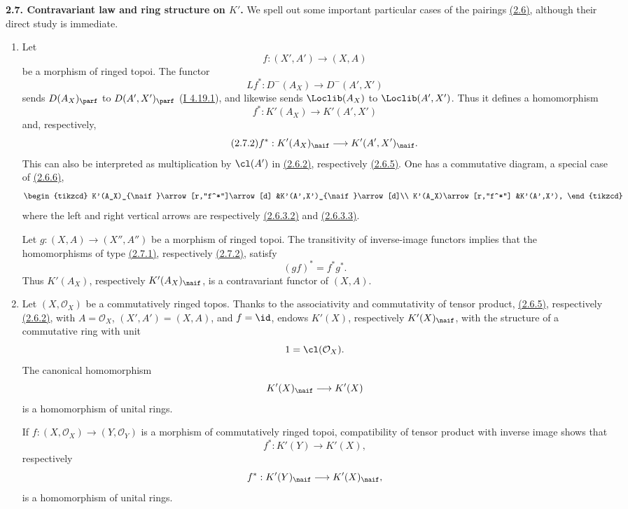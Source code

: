 \textbf{2.7. Contravariant law and ring structure on \(K'\).} We spell out some important particular cases of the pairings \hyperlink{sga6.e04.para.2-6}{(2.6)}, although their direct study is immediate.
\begin{enumerate}[label=\alph*)]
\item Let
\[
 f:(X',A')\longrightarrow (X,A)
\]
be a morphism of ringed topoi. The functor
\[
 Lf^*:D^-(A_X)\longrightarrow D^-(A',X')
\]
sends \(D(A_X)_{\parf}\) to \(D(A',X')_{\parf}\) (\hyperlink{sga6.e01.cor.4-19-1}{I 4.19.1}), and likewise sends \(\Loclib(A_X)\) to \(\Loclib(A',X')\). Thus it defines a homomorphism
\begin{equation}\tag{2.7.1}
 f^*:K'(A_X)\longrightarrow K'(A',X')
\end{equation}
and, respectively,
\begin{equation}\tag{2.7.2}
 f^*:K'(A_X)_{\naif}\longrightarrow K'(A',X')_{\naif}.
\end{equation}
This can also be interpreted as multiplication by \(\cl(A')\) in \hyperlink{sga6.e04.eq.2-6-2}{(2.6.2)}, respectively \hyperlink{sga6.e04.eq.2-6-5}{(2.6.5)}. One has a commutative diagram, a special case of \hyperlink{sga6.e04.eq.2-6-6}{(2.6.6)},
\[
\begin{tikzcd}
K'(A_X)_{\naif}\arrow[r,"f^*"]\arrow[d]
&K'(A',X')_{\naif}\arrow[d]\\
K'(A_X)\arrow[r,"f^*"]
&K'(A',X'),
\end{tikzcd}
\]
where the left and right vertical arrows are respectively \hyperlink{sga6.e04.eq.2-6-3-2}{(2.6.3.2)} and \hyperlink{sga6.e04.eq.2-6-3-3}{(2.6.3.3)}.

Let \(g:(X,A)\to(X'',A'')\) be a morphism of ringed topoi. The transitivity of inverse-image functors implies that the homomorphisms of type \hyperlink{sga6.e04.eq.2-7-1}{(2.7.1)}, respectively \hyperlink{sga6.e04.eq.2-7-2}{(2.7.2)}, satisfy
\begin{equation}\tag{2.7.3}
 (gf)^*=f^*g^*.
\end{equation}
Thus \(K'(A_X)\), respectively \(K'(A_X)_{\naif}\), is a contravariant functor of \((X,A)\).

\item Let \((X,\mathcal O_X)\) be a commutatively ringed topos. Thanks to the associativity and commutativity of tensor product, \hyperlink{sga6.e04.eq.2-6-5}{(2.6.5)}, respectively \hyperlink{sga6.e04.eq.2-6-2}{(2.6.2)}, with \(A=\mathcal O_X\), \((X',A')=(X,A)\), and \(f=\id\), endows \(K'(X)\), respectively \(K'(X)_{\naif}\), with the structure of a commutative ring with unit
\[
 1=\cl(\mathcal O_X).
\]
The canonical homomorphism
\[
 K'(X)_{\naif}\longrightarrow K'(X)
\]
is a homomorphism of unital rings.

If \(f:(X,\mathcal O_X)\to(Y,\mathcal O_Y)\) is a morphism of commutatively ringed topoi, compatibility of tensor product with inverse image shows that
\[
 f^*:K'(Y)\longrightarrow K'(X),
\]
respectively
\[
 f^*:K'(Y)_{\naif}\longrightarrow K'(X)_{\naif},
\]
is a homomorphism of unital rings.
\end{enumerate}

